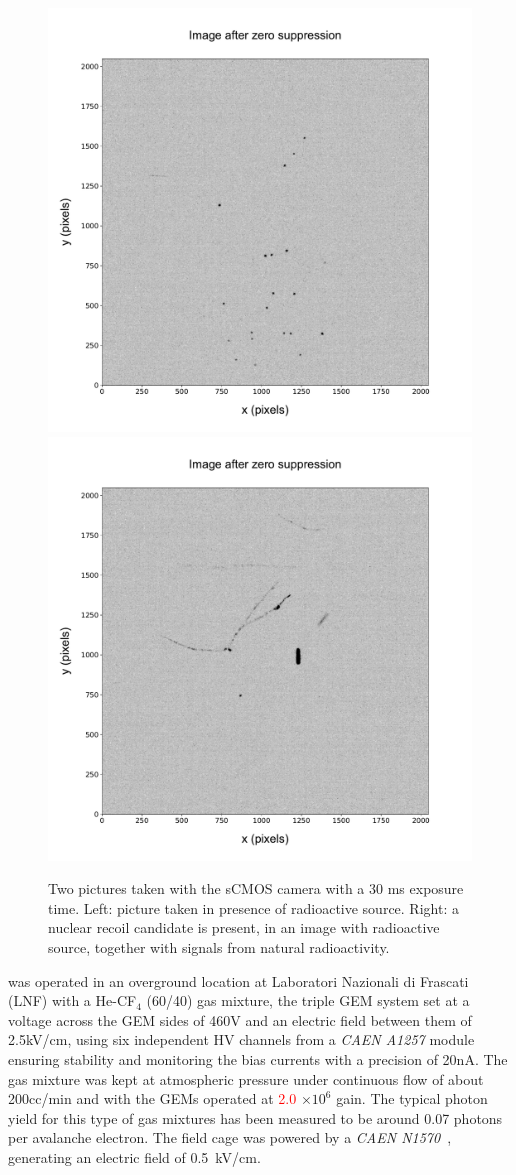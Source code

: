 \documentclass[12pt]{iopart}
\begin{document}
 
\begin{figure}[ht]
  \begin{center}
    \includegraphics[width=0.49\linewidth]{figures/pic_run01843_ev93_oriIma_paper}
    \includegraphics[width=0.49\linewidth]{figures/pic_run02317_ev342_oriIma_paper}
    \caption{Two pictures taken with the sCMOS camera with a 30 ms
      exposure time. Left: picture taken in presence of \fe radioactive
      source. Right: a nuclear recoil candidate is present, in an image
      with \ambe radioactive source, together with signals from natural
      radioactivity.      \label{fig:signals}}
  \end{center}
\end{figure}

\lemon was operated in an overground location at Laboratori Nazionali
di Frascati (LNF) with a He-CF$_4$ (60/40) gas mixture, the triple GEM
system set at a voltage across the GEM sides of 460\unit{V} and an
electric field between them of 2.5\unit{kV/cm}, using six independent HV
channels from a \textit{CAEN A1257} module
ensuring stability and monitoring the bias currents with a precision
of 20\unit{nA}. The gas mixture was kept at atmospheric pressure under
continuous flow of about 200\unit{cc/min} and with the GEMs operated
at \textcolor{red}{2.0} $ \times10^6$ gain. The typical photon yield
for this type of gas mixtures has been measured to be around 0.07
photons per avalanche electron\cite{bib:jinst_orange1, bib:roby,
  bib:tesinatalia}. The field cage was powered by a \textit{CAEN
  N1570}~\cite{CAENN1570}, generating an electric field of 0.5~kV/cm.
\end{document}
